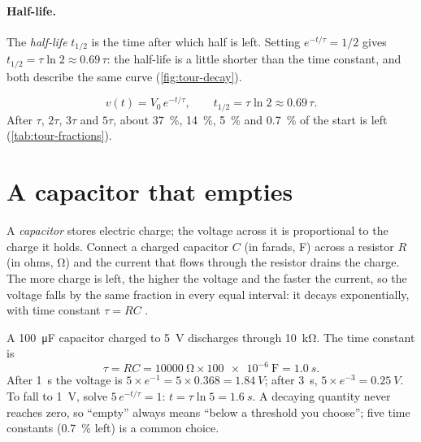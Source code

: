 \paragraph{Half-life.} The \emph{half-life} $t_{1/2}$ is the time after which half is left. Setting
$e^{-t/\tau}=1/2$ gives $t_{1/2}=\tau\ln 2\approx0.69\,\tau$: the half-life is a little shorter than the time
constant, and both describe the same curve (\cref{fig:tour-decay}).

\begin{insightbox}
\[
  v(t)=V_0\,e^{-t/\tau},\qquad t_{1/2}=\tau\ln 2\approx 0.69\,\tau .
\]
After $\tau$, $2\tau$, $3\tau$ and $5\tau$, about \qty{37}{\percent}, \qty{14}{\percent}, \qty{5}{\percent} and
\qty{0.7}{\percent} of the start is left (\cref{tab:tour-fractions}).
\end{insightbox}



\section{A capacitor that empties}
\label{sec:tour-rc}

A \emph{capacitor} stores electric charge; the voltage across it is proportional to the charge it holds. Connect a
charged capacitor $C$ (in farads, \unit{\farad}) across a resistor $R$ (in ohms, \unit{\ohm}) and the current that
flows through the resistor drains the charge. The more charge is left, the higher the voltage and the faster the
current, so the voltage falls by the same fraction in every equal interval: it decays exponentially, with time
constant $\tau=RC$ \cite{horowitz2015art}.

\begin{workedbox}
A \qty{100}{\micro\farad} capacitor charged to \qty{5}{V} discharges through \qty{10}{\kilo\ohm}. The time
constant is
\[
  \tau = RC = \qty{10000}{\ohm}\times\qty{100e-6}{\farad} = \qty{1.0}{s}.
\]
After \qty{1}{s} the voltage is $5\times e^{-1}=5\times0.368=\qty{1.84}{V}$; after \qty{3}{s}, $5\times e^{-3}=\qty{0.25}{V}$. To
fall to \qty{1}{V}, solve $5\,e^{-t/\tau}=1$: $t=\tau\ln 5=\qty{1.6}{s}$. A decaying quantity never reaches zero,
so ``empty'' always means ``below a threshold you choose''; five time constants (\qty{0.7}{\percent} left) is a
common choice.
\end{workedbox}

